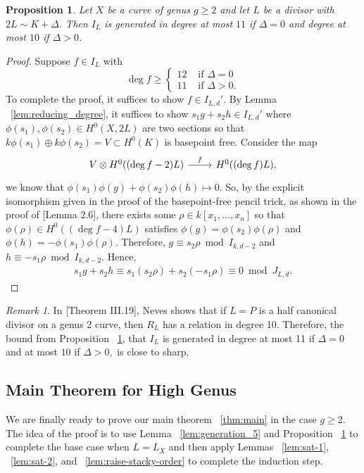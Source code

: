 \documentclass{amsart}
\theoremstyle{plain}
\newtheorem{prop}[thm]{Proposition}
\theoremstyle{definition}
\theoremstyle{remark}
\newtheorem{rem}[thm]{Remark}
\numberwithin{equation}{section}
\newcommand\ssec{\subsection}
\begin{document}
\begin{prop}
\label{prop:relation_11}
Let $X$ be a curve of genus $g \geq 2$ and let $L$ be a divisor with $2L \sim K + \Delta$. Then $I_L$ is generated in degree at most $11$ if $\Delta = 0$ and degree at most $10$ if $\Delta > 0$.
\end{prop}
\begin{proof}
Suppose $f \in I_L$ with 
$$
\deg f \geq \begin{cases}
	12 &\text{ if }\Delta = 0\\
	11 &\text{ if }\Delta > 0.
\end{cases}$$
To complete the proof, it suffices to show $f \in I_{L,d}'$. By Lemma ~\ref{lem:reducing_degree}, it suffices to show $s_1g+s_2h \in I_{L,d}'$ where $\phi(s_1),\phi(s_2) \in H^0(X,2L)$ are two sections so that $k\phi(s_1) \oplus k \phi(s_2) = V \subset H^0(K)$ is basepoint free. Consider the map
$$\begin{tikzcd}
V \otimes H^0((\deg f - 2)L) \ar {r}{f} & H^0((\deg f)L),
\end{tikzcd}$$
we know that $\phi(s_1)\phi(g) + \phi(s_2) \phi(h) \mapsto 0.$
So, by the explicit isomorphism given in the proof of the basepoint-free pencil trick, as shown in the proof of \cite{saint-donat:proj}[Lemma 2.6], there exists some $\rho \in k[x_1, \ldots, x_n]$ so that $\phi(\rho) \in H^0((\deg f - 4)L)$ satisfies $\phi(g) = \phi(s_2)\phi(\rho)$ and $\phi(h) = -\phi(s_1)\phi(\rho).$ Therefore, $g \equiv s_2 \rho \bmod I_{k,d-2}$ and $h \equiv -s_1 \rho \bmod I_{k,d-2}$. Hence,
\begin{align*}
	s_1g + s_2h \equiv s_1(s_2\rho) + s_2(-s_1 \rho) \equiv 0 \bmod J_{L,d}.
\end{align*}
\end{proof}

\begin{rem}
\label{rem:relations_generation_ten}
In \cite{neves:halfcan}[Theorem III.19], Neves shows that if $L=P$ is a half canonical divisor on a genus 2 curve, then $R_L$ has a relation in degree 10. Therefore, the bound from Proposition ~\ref{prop:relation_11}, that $I_L$ is generated in degree at most 11 if $\Delta = 0$ and at most $10$ if $\Delta > 0,$ is close to sharp.
\end{rem}



\ssec{Main Theorem for High Genus}
\label{ssec:g-high-main}

We are finally ready to prove our main theorem ~\ref{thm:main} in the case $g \geq 2$. The idea of the proof is to use Lemma ~\ref{lem:generation_5} and Proposition ~\ref{prop:relation_11} to complete the base case when $L = L_X$ and then apply Lemmas ~\ref{lem:sat-1}, ~\ref{lem:sat-2}, and ~\ref{lem:raise-stacky-order} to complete the induction step.
\end{document}
